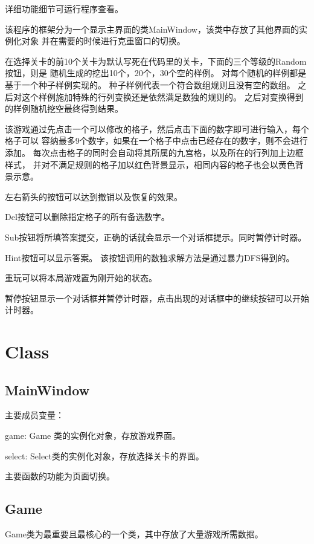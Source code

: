 \documentclass[hyperref,UTF8]{ctexart}
\begin{document}
    详细功能细节可运行程序查看。

    该程序的框架分为一个显示主界面的类MainWindow，该类中存放了其他界面的实例化对象
    并在需要的时候进行克重窗口的切换。

    在选择关卡的前10个关卡为默认写死在代码里的关卡，下面的三个等级的Random按钮，则是
    随机生成的挖出10个，20个，30个空的样例。
    对每个随机的样例都是基于一个种子样例实现的。
    种子样例代表一个符合数组规则且没有空的数组。
    之后对这个样例施加特殊的行列变换还是依然满足数独的规则的。
    之后对变换得到的样例随机挖空最终得到结果。


    该游戏通过先点击一个可以修改的格子，然后点击下面的数字即可进行输入，每个格子可以
    容纳最多9个数字，如果在一个格子中点击已经存在的数字，则不会进行添加。
    每次点击格子的同时会自动将其所属的九宫格，以及所在的行列加上边框样式，
    并对不满足规则的格子加以红色背景显示，相同内容的格子也会以黄色背景示意。

    左右箭头的按钮可以达到撤销以及恢复的效果。

    Del按钮可以删除指定格子的所有备选数字。

    Sub按钮将所填答案提交，正确的话就会显示一个对话框提示。同时暂停计时器。

    Hint按钮可以显示答案。
    该按钮调用的数独求解方法是通过暴力DFS得到的。

    重玩可以将本局游戏置为刚开始的状态。

    暂停按钮显示一个对话框并暂停计时器，点击出现的对话框中的继续按钮可以开始计时器。

\newpage

\section{Class}
\subsection{MainWindow}
    主要成员变量：

    game:                             Game 类的实例化对象，存放游戏界面。

    select:                           Select类的实例化对象，存放选择关卡的界面。

    主要函数的功能为页面切换。



\subsection{Game}
    Game类为最重要且最核心的一个类，其中存放了大量游戏所需数据。
\end{document}
